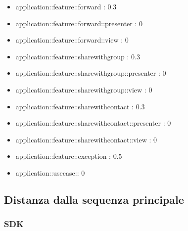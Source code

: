 \begin{itemize}
\item application::feature::forward : 0.3
\item application::feature::forward::presenter : 0
\item application::feature::forward::view : 0
\item application::feature::sharewithgroup : 0.3
\item application::feature::sharewithgroup::presenter : 0
\item application::feature::sharewithgroup::view : 0
\item application::feature::sharewithcontact : 0.3
\item application::feature::sharewithcontact::presenter : 0 
\item application::feature::sharewithcontact::view : 0
\item application::feature::exception : 0.5
\item application::usecase:: 0

\end{itemize}

\subsection{Distanza dalla sequenza principale}

\subsubsection{SDK}

